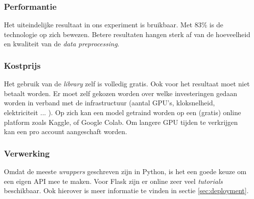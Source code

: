 \subsubsection{Performantie}
\label{sucsubsec:autokeras-nfr-performantie}

Het uiteindelijke resultaat in ons experiment is bruikbaar. Met 83\% is de technologie op zich bewezen. Betere resultaten hangen sterk af van de hoeveelheid en kwaliteit van de \textit{data preprocessing}.

\subsubsection{Kostprijs}
\label{sucsubsec:autokeras-nfr-price}

Het gebruik van de \textit{library} zelf is volledig gratis. Ook voor het resultaat moet niet betaalt worden. Er moet zelf gekozen worden over welke investeringen gedaan worden in verband met de infrastructuur (aantal GPU's, kloksnelheid, elektriciteit ... ). Op zich kan een model getraind worden op een (gratis) online platform zoals Kaggle, of Google Colab. Om langere GPU tijden te verkrijgen kan een pro account aangeschaft worden.

\subsubsection{Verwerking}
\label{sucsubsec:autokeras-nfr-verwerking}

Omdat de meeste \textit{wrappers} geschreven zijn in Python, is het een goede keuze om een eigen API mee te maken. Voor Flask zijn er online zeer veel \textit{tutorials} beschikbaar. Ook hierover is meer informatie te vinden in sectie \ref{sec:deployment}.
